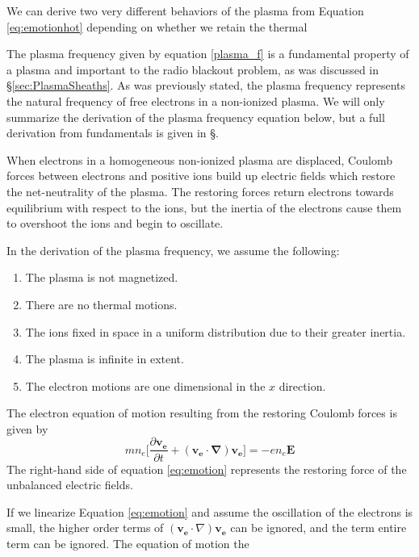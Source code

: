 \documentclass[twocolumn]{article}
\begin{document}
We can derive two very different behaviors of the plasma from Equation \ref{eq:emotionhot} depending on whether we retain the thermal

The plasma frequency given by equation \ref{plasma_f} is a fundamental property of a plasma and important to the radio blackout problem, as was discussed in \S\ref{sec:PlasmaSheaths}.
As was previously stated, the plasma frequency represents the natural frequency of free electrons in a non-ionized plasma.
We will only summarize the derivation of the plasma frequency equation below, but a full derivation from fundamentals is given in \S\cite{chen_introduction_1984}.

When electrons in a homogeneous non-ionized plasma are displaced, Coulomb forces between electrons and positive ions build up electric fields which restore the net-neutrality of the plasma.
The restoring forces return electrons towards equilibrium with respect to the ions, but the inertia of the electrons cause them to overshoot the ions and begin to oscillate.

In the derivation of the plasma frequency, we assume the following:
\begin{enumerate}
	\item The plasma is not magnetized.
	\item There are no thermal motions.
	\item The ions fixed in space in a uniform distribution due to their greater inertia.
	\item The plasma is infinite in extent.
	\item The electron motions are one dimensional in the $x$ direction.
\end{enumerate}

The electron equation of motion resulting from the restoring Coulomb forces is given by
\begin{equation} \label{eq:emotion}
	mn_e \lbrack \frac{\partial \mathbf{v_e}}{\partial t} + \left( \mathbf{v_e} \cdot \mathbf{\nabla} \right) \mathbf{v_e} \rbrack = -en_e\mathbf{E}
\end{equation}
The right-hand side of equation \ref{eq:emotion} represents the restoring force of the unbalanced electric fields.

If we linearize Equation \ref{eq:emotion} and assume the oscillation of the electrons is small, the higher order terms of $\left(\mathbf{v_e} \cdot \nabla \right) \mathbf{v_e}$ can be ignored, and the term entire term can be ignored.
The equation of motion the
\end{document}
